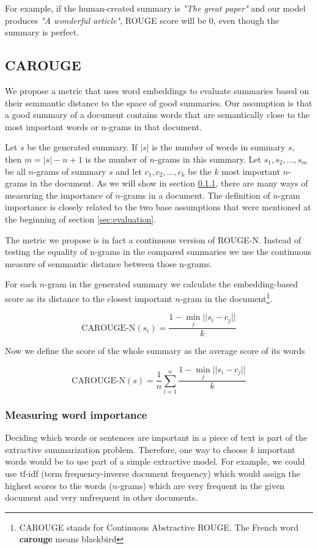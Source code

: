 \documentclass[sigplan]{acmart}
\begin{document}
For example, if the human-created summary is \textit{"The great paper"} and our model produces \textit{"A wonderful article"}, ROUGE score will be $0$, even though the summary is perfect.

\subsection{CAROUGE}

We propose a metric that uses word embeddings to evaluate summaries based on their semmantic distance to the space of good summaries. Our assumption is that a good summary of a document contains words that are semantically close to the most important words or n-grams in that document.

Let $s$ be the generated summary. If $|s|$ is the number of words in summary $s$, then $m=|s|-n+1$ is the number of $n$-grams in this summary. Let $s_1, s_2, \dots, s_m$ be all $n$-grams of summary $s$ and let $c_1, c_2, \dots, c_k$ be the $k$ most important $n$-grams in the document. As we will show in section \ref{sec:importance}, there are many ways of measuring the importance of $n$-grams in a document. The definition of $n$-gram importance is closely related to the two base assumptions that were mentioned at the beginning of section \ref{sec:evaluation}.

The metric we propose is in fact a continuous version of ROUGE-N. Instead of testing the equality of n-grams in the compared summaries we use the continuous measure of semmantic distance between those n-grams.

For each $n$-gram in the generated summary we calculate the embedding-based score as its distance to the closest important $n$-gram in the document\footnote{CAROUGE stands for Continuous Abstractive ROUGE. The French word \textbf{carouge} means blackbird}.

\[ \text{CAROUGE-N}(s_i) = \frac{1 - \operatorname*{min}_j ||s_i - c_j||}{k} \]

Now we define the score of the whole summary as the average score of its words

\[ \text{CAROUGE-N}(s) = \frac1n \sum_{i=1}^n \frac{1 - \operatorname*{min}_j ||s_i - c_j||}{k} \]

\subsubsection{Measuring word importance}
\label{sec:importance}

Deciding which words or sentences are important in a piece of text is part of the extractive summarization problem. Therefore, one way to choose $k$ important words would be to use part of a simple extractive model. For example, we could use tf-idf (term frequency-inverse document frequency) which would assign the highest scores to the words ($n$-grams) which are very frequent in the given document and very unfrequent in other documents.
\end{document}
